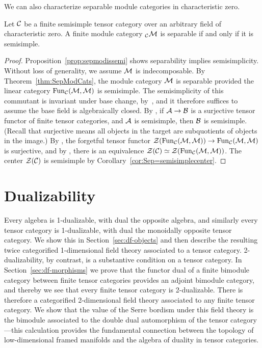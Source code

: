 \documentclass{amsart}
\begin{document}
We can also characterize separable module categories in characteristic zero.

\begin{proposition} \label{prop:SSModuleCatsAreSep}
Let $\mathcal C$ be a finite semisimple tensor category over an arbitrary field of characteristic zero.  A finite module category ${}_\mathcal C \mathcal M$ is separable if and only if it is semisimple.
\end{proposition}
\begin{proof}
Proposition~\ref{prop:sepmodissemi} shows separability implies semisimplicity.
Without loss of generality, we assume $\mathcal M$ is indecomposable.  By Theorem~\ref{thm:SepModCats}, the module category $\mathcal M$ is separable provided the linear category $\operatorname{Fun}_\mathcal C(\mathcal M,\mathcal M)$ is semisimple.  The semisimplicity of this commutant is invariant under base change, by~\cite[Lemma 5.2]{1002.0168}, and it therefore suffices to assume the base field is algebraically closed.  By \cite[Thm. 2.5]{EO-ftc}, if $\mathcal A \rightarrow \mathcal B$ is a surjective tensor functor of finite tensor categories, and $\mathcal A$ is semisimple, then $\mathcal B$ is semisimple.  (Recall that surjective means all objects in the target are subquotients of objects in the image.)  By \cite[Prop. 3.39]{EO-ftc}, the forgetful tensor functor $\mathcal Z(\operatorname{Fun}_\mathcal C(\mathcal M,\mathcal M)) \rightarrow \operatorname{Fun}_\mathcal C(\mathcal M,\mathcal M)$ is surjective, and by \cite[Cor. 3.35]{EO-ftc}, there is an equivalence $\mathcal Z(\mathcal C) \simeq \mathcal Z(\operatorname{Fun}_\mathcal C(\mathcal M,\mathcal M))$.  The center $\mathcal Z(\mathcal C)$ is semisimple by Corollary~\ref{cor:Sep=semisimplecenter}.
\end{proof}




\section{Dualizability} \label{sec:dualizability}


Every algebra is 1-dualizable, with dual the opposite algebra, and similarly every tensor category is 1-dualizable, with dual the monoidally opposite tensor category.  We show this in Section~\ref{sec:df-objects} and then describe the resulting twice categorified 1-dimensional field theory associated to a tensor category.  2-dualizability, by contrast, is a substantive condition on a tensor category.  In Section~\ref{sec:df-morphisms} we prove that the functor dual of a finite bimodule category between finite tensor categories provides an adjoint bimodule category, and thereby we see that every finite tensor category is 2-dualizable.  There is therefore a categorified 2-dimensional field theory associated to any finite tensor category.  We show that the value of the Serre bordism under this field theory is the bimodule associated to the double dual automorphism of the tensor category---this calculation provides the fundamental connection between the topology of low-dimensional framed manifolds and the algebra of duality in tensor categories.  
\end{document}
